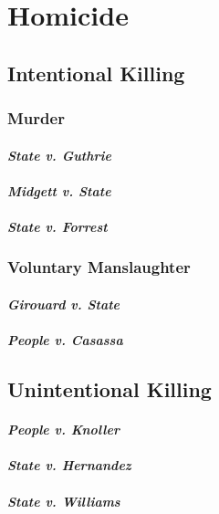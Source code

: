 \section{Homicide}

\subsection{Intentional Killing}

\subsubsection{Murder}

\paragraph{\emph{State v. Guthrie}}

\paragraph{\emph{Midgett v. State}}

\paragraph{\emph{State v. Forrest}}

\subsubsection{Voluntary Manslaughter}

\paragraph{\emph{Girouard v. State}}

\paragraph{\emph{People v. Casassa}}

\subsection{Unintentional Killing}

\paragraph{\emph{People v. Knoller}}

\paragraph{\emph{State v. Hernandez}}

\paragraph{\emph{State v. Williams}}

